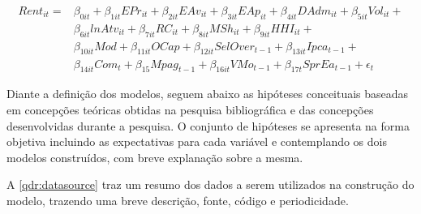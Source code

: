 \documentclass[
  12pt,
  12pt,
  openright,
  oneside,
  a4paper,
  chapter=TITLE,
  section=TITLE,
  subsection=TITLE,
  subsubsection=TITLE,
  english,
  portugues,
  sumario=tradicional]{abntex2}
\begin{document}
\begin{equation}
\begin{aligned}
Rent_{it} = & \beta_{0it} + \beta_{1it}EPr_{it} + \beta_{2it}EAv_{it} + \beta_{3it}EAp_{it} + \beta_{4it}DAdm_{it} + \beta_{5it}Vol_{it} + \\
& \beta_{6it}lnAtv_{it} + \beta_{7it}RC_{it} + \beta_{8it}MSh_{it} + \beta_{9it}HHI_{it} + \\ 
& \beta_{10it}Mod + \beta_{11it}OCap + \beta_{12it}SelOver_{t-1} + \beta_{13it}Ipca_{t-1} + \\
& \beta_{14it}Com_{t} + \beta_{15}Mpag_{t-1} + \beta_{16it}VMo_{t-1} +  \beta_{17t}SprEa_{t-1} + \epsilon_{t}
\end{aligned}
\end{equation}

Diante a definição dos modelos, seguem abaixo as hipóteses conceituais baseadas em concepções teóricas obtidas na pesquisa bibliográfica e das concepções desenvolvidas durante a pesquisa. O conjunto de hipóteses se apresenta na forma objetiva incluindo as expectativas para cada variável e contemplando os dois modelos construídos, com breve explanação sobre a mesma.

A \autoref{qdr:datasource} traz um resumo dos dados a serem utilizados na construção do modelo, trazendo uma breve descrição, fonte, código e periodicidade.
\end{document}
